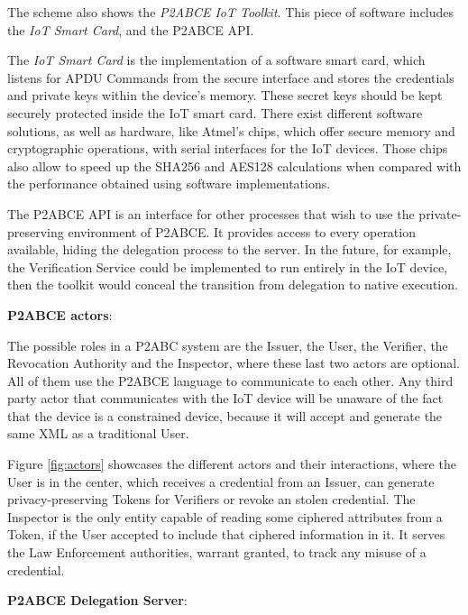 	The scheme also shows the \textit{P2ABCE IoT Toolkit}. This piece of software includes the \textit{IoT Smart Card}, and the P2ABCE API.
	
	The \textit{IoT Smart Card} is the implementation of a software smart card, which listens for APDU Commands from the secure interface and stores the credentials and private keys within the device's memory. 
	These secret keys should be kept securely protected inside the IoT smart card. There exist different software solutions, as well as hardware, like Atmel's chips, which offer secure memory and cryptographic operations, with serial interfaces for the IoT devices. Those chips also allow to speed up the SHA256 and AES128 calculations when compared with the performance obtained using software implementations.
	
	The P2ABCE API is an interface for other processes that wish to use the private-preserving environment of P2ABCE. It provides access to every operation available, hiding the delegation process to the server. In the future, for example, the Verification Service could be implemented to run entirely in the IoT device, then the toolkit would conceal the transition from delegation to native execution.
	
\hfil

\begin{flushleft}
	\textbf{P2ABCE actors}:
\end{flushleft}
	
	The possible roles in a P2ABC system are the Issuer, the User, the Verifier, the Revocation Authority and the Inspector, where these last two actors are optional. All of them use the P2ABCE language to communicate to each other. Any third party actor that communicates with the IoT device will be unaware of the fact that the device is a constrained device, because it will accept and generate the same XML as a traditional User.
	
	Figure \ref{fig:actors} showcases the different actors and their interactions, where the User is in the center, which receives a credential from an Issuer, can generate privacy-preserving Tokens for Verifiers or revoke an stolen credential. The Inspector is the only entity capable of reading some ciphered attributes from a Token, if the User accepted to include that ciphered information in it. It serves the Law Enforcement authorities, warrant granted, to track any misuse of a credential.
	
\hfil
	
\begin{flushleft}
	\textbf{P2ABCE Delegation Server}:
\end{flushleft}
	
